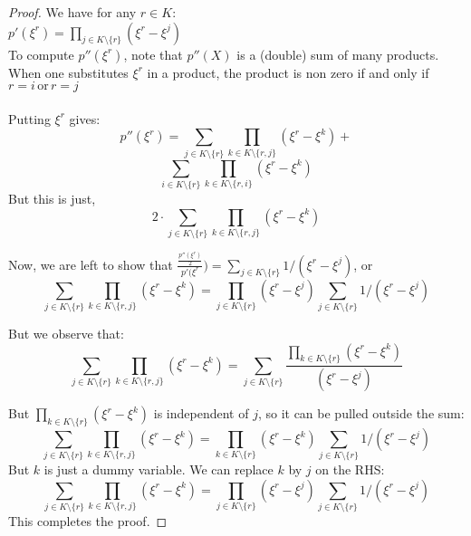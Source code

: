 \begin{proof}

    We have for any $r \in K$:\\
    $p'(\xi^r)=\prod_{j \in K \setminus \{r\}}(\xi^r-\xi^j)$\\
    To compute $p''(\xi^r)$, note that $p''(X)$ is a (double) sum of many products. When one substitutes $\xi^r$ in a product, the product is non zero if and only if $r=i\, \text{or}\, r=j$\\\\

    Putting $\xi^r$ gives:
    $$ p''(\xi^r)=\sum_{j\in K\setminus \{r\}}\prod_{k\in K\setminus \{r,j\}} (\xi^r-\xi^k)+$$
    $$ \sum_{i\in K\setminus \{r\}}\prod_{k\in K\setminus \{r,i\}} (\xi^r-\xi^k) $$
    But this is just,
    $$2\cdot \sum_{j\in K\setminus \{r\}}\prod_{k\in K\setminus \{r,j\}} (\xi^r-\xi^k) $$

    Now, we are left to show that $\frac{\frac{p''(\xi^r)}{2}}{p'(\xi^r})=\sum_{j\in K\setminus \{r\}} 1/(\xi^r-\xi^j)$, or
    $$\sum_{j\in K\setminus \{r\}}\prod_{k\in K\setminus \{r,j\}} (\xi^r-\xi^k)=\prod_{j \in K \setminus \{r\}}(\xi^r-\xi^j) \sum_{j\in K\setminus \{r\}} 1/(\xi^r-\xi^j)$$

    But we observe that:
    $$\sum_{j\in K\setminus \{r\}}\prod_{k\in K\setminus \{r,j\}} (\xi^r-\xi^k)=\sum_{j\in K\setminus \{r\}}\frac{\prod_{k\in K\setminus \{r\}} (\xi^r-\xi^k)}{(\xi^r-\xi^j)}$$

    But $\prod_{k\in K\setminus \{r\}} (\xi^r-\xi^k)$ is independent of $j$, so it can be pulled outside the sum:
    $$\sum_{j\in K\setminus \{r\}}\prod_{k\in K\setminus \{r,j\}} (\xi^r-\xi^k)=\prod_{k\in K\setminus \{r\}} (\xi^r-\xi^k) \sum_{j\in K\setminus \{r\}} 1/(\xi^r-\xi^j) $$
    But $k$ is just a dummy variable. We can replace $k$ by $j$ on the RHS:
    $$\sum_{j\in K\setminus \{r\}}\prod_{k\in K\setminus \{r,j\}} (\xi^r-\xi^k)=\prod_{j\in K\setminus \{r\}} (\xi^r-\xi^j) \sum_{j\in K\setminus \{r\}} 1/(\xi^r-\xi^j) $$
    This completes the proof.
\end{proof}

